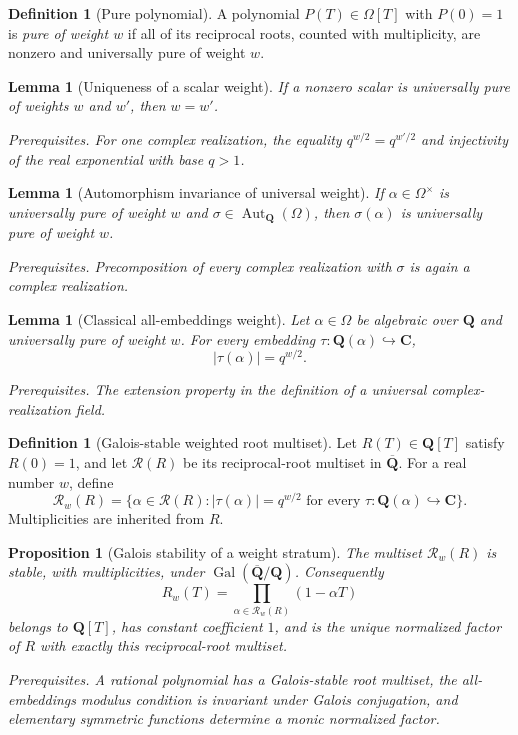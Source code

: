 \documentclass[10pt]{article}
\newtheorem{proposition}[theorem]{Proposition}
\newtheorem{lemma}[theorem]{Lemma}
\theoremstyle{definition}
\newtheorem{definition}[theorem]{Definition}
\newcommand{\Qbar}{\overline{\mathbf Q}}
\newcommand{\Gal}{\operatorname{Gal}}
\newcommand{\deps}[1]{\par\smallskip\noindent\textit{Prerequisites.} #1}
\begin{document}
\begin{definition}[Pure polynomial]
A polynomial \(P(T)\in\Omega[T]\) with \(P(0)=1\) is \emph{pure of weight
\(w\)} if all of its reciprocal roots, counted with multiplicity, are
nonzero and universally pure of weight \(w\).
\end{definition}

\begin{lemma}[Uniqueness of a scalar weight]
If a nonzero scalar is universally pure of weights \(w\) and \(w'\), then
\(w=w'\).
\deps{For one complex realization, the equality
\(q^{w/2}=q^{w'/2}\) and injectivity of the real exponential with base
\(q>1\).}
\end{lemma}

\begin{lemma}[Automorphism invariance of universal weight]
If \(\alpha\in\Omega^\times\) is universally pure of weight \(w\) and
\(\sigma\in\operatorname{Aut}_{\mathbf Q}(\Omega)\), then
\(\sigma(\alpha)\) is universally pure of weight \(w\).
\deps{Precomposition of every complex realization with \(\sigma\) is again
a complex realization.}
\end{lemma}

\begin{lemma}[Classical all-embeddings weight]
Let \(\alpha\in\Omega\) be algebraic over \(\mathbf Q\) and universally
pure of weight \(w\).  For every embedding
\(\tau:\mathbf Q(\alpha)\hookrightarrow\mathbf C\),
\[
 |\tau(\alpha)|=q^{w/2}.
\]
\deps{The extension property in the definition of a universal
complex-realization field.}
\end{lemma}

\begin{definition}[Galois-stable weighted root multiset]
Let \(R(T)\in\mathbf Q[T]\) satisfy \(R(0)=1\), and let
\(\mathcal R(R)\) be its reciprocal-root multiset in \(\Qbar\).  For a
real number \(w\), define
\[
 \mathcal R_w(R)=\{\alpha\in\mathcal R(R):
 |\tau(\alpha)|=q^{w/2}
 \text{ for every }\tau:\mathbf Q(\alpha)\hookrightarrow\mathbf C\}.
\]
Multiplicities are inherited from \(R\).
\end{definition}

\begin{proposition}[Galois stability of a weight stratum]
The multiset \(\mathcal R_w(R)\) is stable, with multiplicities, under
\(\Gal(\Qbar/\mathbf Q)\).  Consequently
\[
 R_w(T)=\prod_{\alpha\in\mathcal R_w(R)}(1-\alpha T)
\]
belongs to \(\mathbf Q[T]\), has constant coefficient \(1\), and is the
unique normalized factor of \(R\) with exactly this reciprocal-root
multiset.
\deps{A rational polynomial has a Galois-stable root multiset, the
all-embeddings modulus condition is invariant under Galois conjugation, and
elementary symmetric functions determine a monic normalized factor.}
\end{proposition}
\end{document}
